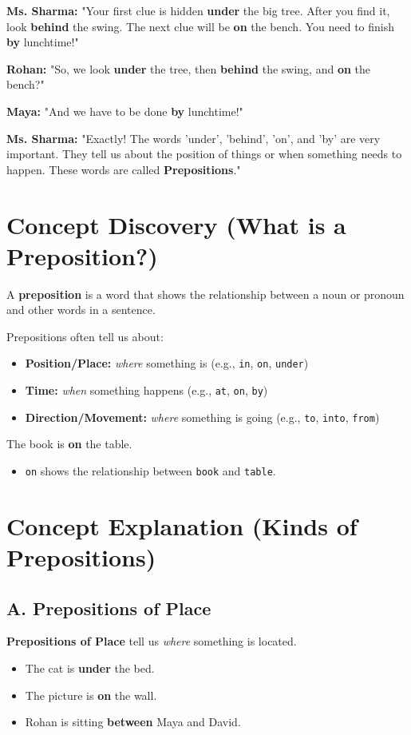 \textbf{Ms. Sharma:} "Your first clue is hidden \textbf{under} the big tree. After you find it, look \textbf{behind} the swing. The next clue will be \textbf{on} the bench. You need to finish \textbf{by} lunchtime!"

\textbf{Rohan:} "So, we look \textbf{under} the tree, then \textbf{behind} the swing, and \textbf{on} the bench?"

\textbf{Maya:} "And we have to be done \textbf{by} lunchtime!"

\textbf{Ms. Sharma:} "Exactly! The words 'under', 'behind', 'on', and 'by' are very important. They tell us about the position of things or when something needs to happen. These words are called \textbf{Prepositions}."

\section{Concept Discovery (What is a Preposition?)}
A \textbf{preposition} is a word that shows the relationship between a noun or pronoun and other words in a sentence.

Prepositions often tell us about:
\begin{itemize}
    \item \textbf{Position/Place:} \textit{where} something is (e.g., \texttt{in}, \texttt{on}, \texttt{under})
    \item \textbf{Time:} \textit{when} something happens (e.g., \texttt{at}, \texttt{on}, \texttt{by})
    \item \textbf{Direction/Movement:} \textit{where} something is going (e.g., \texttt{to}, \texttt{into}, \texttt{from})
\end{itemize}

\begin{examplebox}
    The book is \textbf{on} the table.
    \begin{itemize}
        \item \texttt{on} shows the relationship between \texttt{book} and \texttt{table}.
    \end{itemize}
\end{examplebox}

\section{Concept Explanation (Kinds of Prepositions)}

\subsection*{A. Prepositions of Place}
\textbf{Prepositions of Place} tell us \textit{where} something is located.
\begin{itemize}
    \item The cat is \textbf{under} the bed.
    \item The picture is \textbf{on} the wall.
    \item Rohan is sitting \textbf{between} Maya and David.
\end{itemize}

